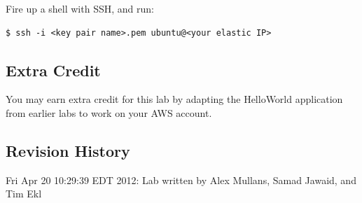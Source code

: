 \documentclass{article}
\begin{document}

Fire up a shell with SSH, and run:

\begin{verbatim}
$ ssh -i <key pair name>.pem ubuntu@<your elastic IP>
\end{verbatim}

\subsection*{Extra Credit}

You may earn extra credit for this lab by adapting the HelloWorld application from earlier labs to work on your AWS account.



\subsection*{Revision History}
\begin{itemize*}
\item Fri Apr 20 10:29:39 EDT 2012: Lab written by Alex Mullans, Samad Jawaid, and Tim Ekl
\end{itemize*}
\end{document}
